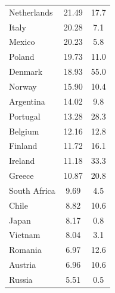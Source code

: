 \begin{longtable}{lcc}
	Netherlands               & 21.49                         & 17.7                              \\
	Italy                     & 20.28                         & 7.1                               \\
	Mexico                    & 20.23                         & 5.8                               \\
	Poland                    & 19.73                         & 11.0                              \\
	Denmark                   & 18.93                         & 55.0                              \\
	Norway                    & 15.90                         & 10.4                              \\
	Argentina                 & 14.02                         & 9.8                               \\
	Portugal                  & 13.28                         & 28.3                              \\
	Belgium                   & 12.16                         & 12.8                              \\
	Finland                   & 11.72                         & 16.1                              \\
	Ireland                   & 11.18                         & 33.3                              \\
	Greece                    & 10.87                         & 20.8                              \\
	South Africa              & 9.69                          & 4.5                               \\
	Chile                     & 8.82                          & 10.6                              \\
	Japan                     & 8.17                          & 0.8                               \\
	Vietnam                   & 8.04                          & 3.1                               \\
	Romania                   & 6.97                          & 12.6                              \\
	Austria                   & 6.96                          & 10.6                              \\
	Russia                    & 5.51                          & 0.5                               \\

\end{longtable}
